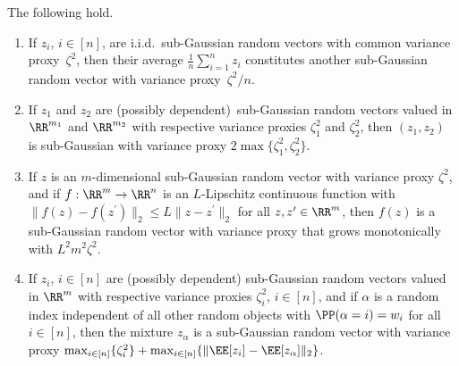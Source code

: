 \documentclass[11pt]{article}
\begin{document}
\begin{lemma}
\label{lemma:sub-gaussianity-preserving-operations} The following hold.
\begin{enumerate}[label=(\roman*)]
    \item If $z_i$, $i\in[n]$, are i.i.d.\ sub-Gaussian random vectors with common variance proxy~$\zeta^2$, then their average $\frac{1}{n}\sum_{i=1}^n z_i$ constitutes another sub-Gaussian random vector with variance proxy~$\zeta^2/n$.
    \item If $z_1$ and $z_2$ are (possibly dependent)\ sub-Gaussian random vectors valued in $\RR^{m_1}$ and $\RR^{m_2}$ with respective variance proxies $\zeta_1^2$ and $\zeta_2^2$, then $(z_1,z_2)$ is sub-Gaussian with variance proxy $2\max\{\zeta_1^2,\zeta_2^2\}$.
    \item If $z$ is an $m$-dimensional sub-Gaussian random vector with variance proxy $\zeta^2$, and if $f:\RR^m\rightarrow \RR^{n}$ is an $L$-Lipschitz continuous function with $\|f(z)-f(z^\prime)\|_2\leq L\|z-z^\prime\|_2$ for all $z,z'\in\RR^m$, then $f(z)$ is a sub-Gaussian random vector with variance proxy that grows monotonically with $L^2m^2\zeta^2$.
    \item If $z_i$, $i\in[n]$ are (possibly dependent) sub-Gaussian random vectors valued in $\RR^{m}$ with respective variance proxies $\zeta_i^2$, $i\in[n]$, and if $\alpha$ is a random index independent of all other random objects with $\PP(\alpha=i)=w_i$ for all $i\in[n]$, then the mixture $z_{\alpha}$ is a sub-Gaussian random vector with variance proxy $\max_{i\in[n]}\{\zeta_i^2\} +\max_{i \in [n]} \{\|\EE[z_i] - \EE[z_\alpha]\|_2\}$.
\end{enumerate}
\end{lemma}
\end{document}
